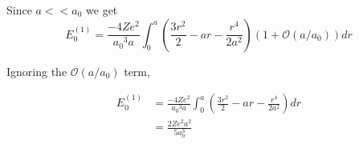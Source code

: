 Since $a<<a_0$ we get
\begin{equation}
     E^{(1)}_0 = \frac{-4Ze^2}{ {a_0}^3 a} \int_0^a \left( \frac{3r^2}{2} - ar - \frac{r^4}{2a^2} \right) (1 + \mathcal{O}(a/a_0)) dr
\end{equation}

Ignoring the $\mathcal{O}(a/a_0)$ term, 

\begin{equation}
\begin{split}
     E^{(1)}_0 &= \frac{-4Ze^2}{ {a_0}^3 a} \int_0^a \left( \frac{3r^2}{2} - ar - \frac{r^4}{2a^2} \right) dr \\
     &=  \frac{2 Ze^2 a^2}{5  a_0^3}
\end{split}
\end{equation}
